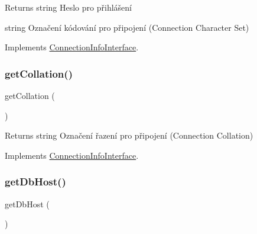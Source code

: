 \begin{DoxyReturn}{Returns}
string Heslo pro přihlášení 

string Označení kódování pro připojení (Connection Character Set) 
\end{DoxyReturn}


Implements \mbox{\hyperlink{interface_pes_1_1_database_1_1_handler_1_1_connection_info_interface_abca2d528da8311b6fcfe040768cbaa24}{Connection\+Info\+Interface}}.

\mbox{\label{class_pes_1_1_database_1_1_handler_1_1_connection_info_a8a2e3a5e3b3b7a164c858bcfdd49ac71}} 
\subsubsection{\texorpdfstring{get\+Collation()}{getCollation()}}
{\footnotesize\ttfamily get\+Collation (\begin{DoxyParamCaption}{ }\end{DoxyParamCaption})}

\begin{DoxyReturn}{Returns}
string Označení řazení pro připojení (Connection Collation) 
\end{DoxyReturn}


Implements \mbox{\hyperlink{interface_pes_1_1_database_1_1_handler_1_1_connection_info_interface_a8a2e3a5e3b3b7a164c858bcfdd49ac71}{Connection\+Info\+Interface}}.

\mbox{\label{class_pes_1_1_database_1_1_handler_1_1_connection_info_ad855d2dfa322f4566b89fcc00fd0e282}} 
\subsubsection{\texorpdfstring{get\+Db\+Host()}{getDbHost()}}
{\footnotesize\ttfamily get\+Db\+Host (\begin{DoxyParamCaption}{ }\end{DoxyParamCaption})}

